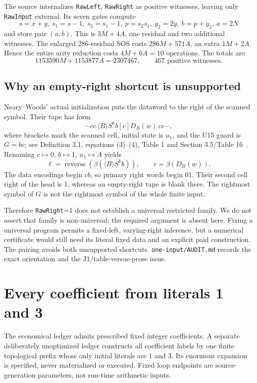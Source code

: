 \documentclass[11pt,letterpaper]{article}
\theoremstyle{definition}\newtheorem{definition}[theorem]{Definition}
\theoremstyle{remark}\newtheorem{remark}[theorem]{Remark}
\newcommand{\codeu}[1]{\nolinkurl{#1}}
\begin{document}
The source internalizes \codeu{RawLeft}, \codeu{RawRight} as positive witnesses, leaving only \codeu{RawInput} external. Its seven gates compute
\[
 s=x+y,\ s_1=s-1,\ s_2=s_1-1,\ p=s_2s_1,\ y_2=2y,\ b=p+y_2,\ a=2N
\]
and store pair $(a,b)$. This is $3M+4A$, one residual and two additional witnesses. The enlarged 286-residual SOS costs $286M+571A$, an extra $1M+2A$. Hence the entire arity reduction costs $4M+6A=10$ operations. The totals are
\[
 1153590M+1153877A=2307467,\qquad467\text{ positive witnesses}.
\]

\subsection{Why an empty-right shortcut is unsupported}
Neary--Woods' actual initialization puts the dataword to the right of the scanned symbol. Their tape has form
\[
 \cdots cc\,\langle B\rangle S^k b[c]D_B(w)\,cc\cdots,
\]
where brackets mark the scanned cell, initial state is $u_1$, and the U15 guard is $G=bc$; see Definition 3.1, equations (3)--(4), Table 1 and Section 3.5/Table 16~\cite{ptr:pc:nw}. Renaming $c\mapsto0$, $b\mapsto1$, $u_1\mapsto A$ yields
\[
 \ell=\operatorname{reverse}(\beta(\langle B\rangle S^k b)),\qquad r=\beta(D_B(w)).
\]
The data encodings begin $cb$, so primary right words begin 01. Their second cell right of the head is 1, whereas an empty-right tape is blank there. The rightmost symbol of $G$ is not the rightmost symbol of the whole finite input.

Therefore \codeu{RawRight}=1 does not establish a universal restricted family. We do not assert that family is non-universal; the required argument is absent here. Fixing a universal program permits a fixed-left, varying-right inference, but a numerical certificate would still need its literal fixed data and an explicit paid construction. The pairing avoids both unsupported shortcuts. \codeu{one-input/AUDIT.md} records the exact orientation and the J1/table-versus-prose issue.

\section{Every coefficient from literals 1 and 3}\label{ptr:pc:sec:strict}
The economical ledger admits prescribed fixed integer coefficients. A separate deliberately unoptimized ledger constructs all coefficient labels by one finite topological prefix whose only initial literals are 1 and 3. Its enormous expansion is specified, never materialized or executed. Fixed loop endpoints are source-generation parameters, not run-time arithmetic inputs.
\end{document}
